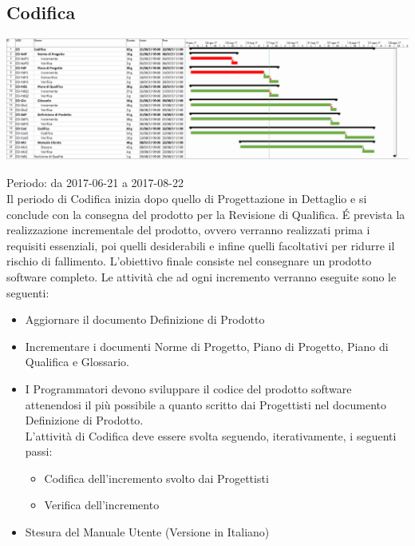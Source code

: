 \subsection{Codifica}

\begin{center}
  \includegraphics[scale=0.23]{img/5-CO.png}
\end{center}

Periodo: da 2017-06-21 a 2017-08-22 \\
Il periodo di Codifica inizia dopo quello di Progettazione in Dettaglio e si conclude
con la consegna del prodotto per la Revisione di Qualifica. 
\'E prevista la realizzazione incrementale del prodotto, ovvero verranno realizzati prima i requisiti essenziali, poi quelli desiderabili e infine quelli facoltativi per ridurre il rischio di fallimento.
L'obiettivo finale consiste nel consegnare un prodotto software completo. Le attività che ad ogni incremento verranno eseguite sono le seguenti:
\begin{itemize}
	\item Aggiornare il documento Definizione di Prodotto
	\item Incrementare i documenti Norme di Progetto, Piano di Progetto, Piano di Qualifica e Glossario.
	\item I Programmatori devono sviluppare il codice del prodotto software attenendosi il più possibile a quanto scritto dai Progettisti nel documento Definizione di Prodotto. \\
    L'attività di Codifica deve essere svolta seguendo, iterativamente, i seguenti passi:
    \begin{itemize}
    	\item Codifica dell'incremento svolto dai Progettisti
    	\item Verifica dell'incremento
	\end{itemize}
	\item Stesura del Manuale Utente (Versione in Italiano)
\end{itemize}

